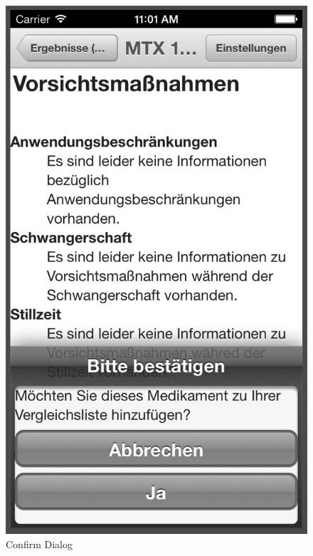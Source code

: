 \begin{figure}[ptb]
\begin{minipage}[b]{0.45\linewidth}
        \includegraphics[width=0.8025\linewidth]{figures/Dialog_bw.jpg}
        \caption[Confirm Action Dialog]{Confirm Dialog}
        \label{fig:ConfirmDialog}
    \end{minipage}
    \hspace{0.5cm}
    \begin{minipage}[b]{0.45\linewidth}
        \centering

\end{minipage}
\end{figure}
